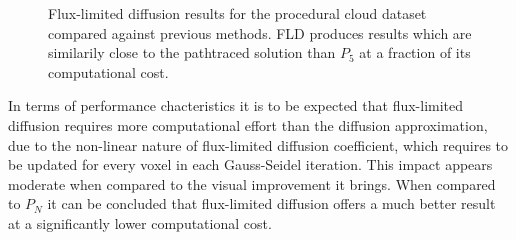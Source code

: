 \begin{figure}[h]
\caption{Flux-limited diffusion results for the procedural cloud dataset compared against previous methods. FLD produces results which are similarily close to the pathtraced solution than $P_5$ at a fraction of its computational cost.}
\label{fig:fld_results_nebulae}
\end{figure}

In terms of performance chacteristics it is to be expected that flux-limited diffusion requires more computational effort than the diffusion approximation, due to the non-linear nature of flux-limited diffusion coefficient, which requires to be updated for every voxel in each Gauss-Seidel iteration. This impact appears moderate when compared to the visual improvement it brings. When compared to $P_N$ it can be concluded that flux-limited diffusion offers a much better result at a significantly lower computational cost.


